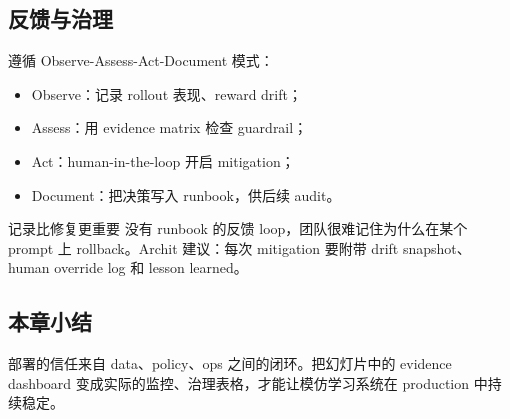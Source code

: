 \subsection{反馈与治理}

遵循 Observe-Assess-Act-Document 模式：
\begin{itemize}
    \item Observe：记录 rollout 表现、reward drift；
    \item Assess：用 evidence matrix 检查 guardrail； 
    \item Act：human-in-the-loop 开启 mitigation；
    \item Document：把决策写入 runbook，供后续 audit。
\end{itemize}

\begin{warningbox}{记录比修复更重要}
没有 runbook 的反馈 loop，团队很难记住为什么在某个 prompt 上 rollback。Archit 建议：每次 mitigation 要附带 drift snapshot、human override log 和 lesson learned。
\end{warningbox}

\subsection{本章小结}

部署的信任来自 data、policy、ops 之间的闭环。把幻灯片中的 evidence dashboard 变成实际的监控、治理表格，才能让模仿学习系统在 production 中持续稳定。

